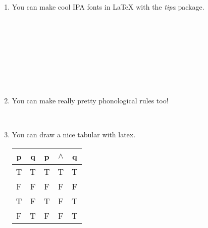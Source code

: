 \documentclass[12pt, letterpaper]{article}
\begin{document}
\begin{enumerate}
\begin{enumerate}
 
                      \item You can make cool IPA fonts in \LaTeX{} with the \textit{tipa} package.\\
                             \begin{center}
                                            \\
                                       \\    

                                          \\   %
                                                             \\  %
                                     \\  
                                             \\
                                      \\
                             \end{center} 

                          
                       \item You can make really pretty phonological rules too!\\
                            \begin{center}
                               \\
                                        \end{center}
                                 


                        \item You can draw a nice tabular with latex.\\
                           \begin{tabular}{cc|ccc}
                                   p & q & p & $\wedge $ & q \\
                                   \hline
                                    T & T & T & T & T \\
                                    F & F & F & F & F \\
                                    T & F & T & F & T \\
                                    F & T & F & F & T 
\end{tabular}


\end{enumerate}
\end{enumerate}
\end{document}
